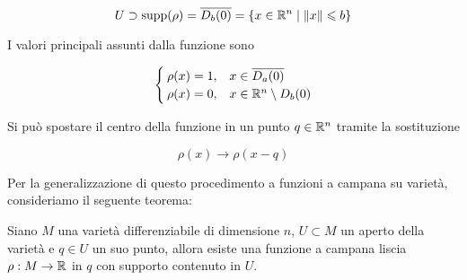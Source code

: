 \begin{equation}
	U \supset \operatorname{supp}(\rho) = \overline{D_{b}(0)} = \{ x \in \mathbb{R}^{n} \mid \norm{x} \leqslant b \}
\end{equation}

I valori principali assunti dalla funzione sono

\begin{equation}
	\begin{cases}
		\rho(x) = 1, & x \in \overline{D_{a}(0)} \\
		\rho(x) = 0, & x \in \mathbb{R}^{n} \setminus D_{b}(0)
	\end{cases}
\end{equation}

Si può spostare il centro della funzione in un punto $ q \in \mathbb{R}^{n} $ tramite la sostituzione

\begin{equation}
	\rho(x) \to \rho(x-q)
\end{equation}

Per la generalizzazione di questo procedimento a funzioni a campana su varietà, consideriamo il seguente teorema:

\begin{theorem}\label{bump-fun}
	Siano $ M $ una varietà differenziabile di dimensione $ n $, $ U \subset M $ un aperto della varietà e $ q \in U $ un suo punto, allora esiste una funzione a campana liscia $ \rho : M \to \mathbb{R} $ in $ q $ con supporto contenuto in $ U $.
\end{theorem}


